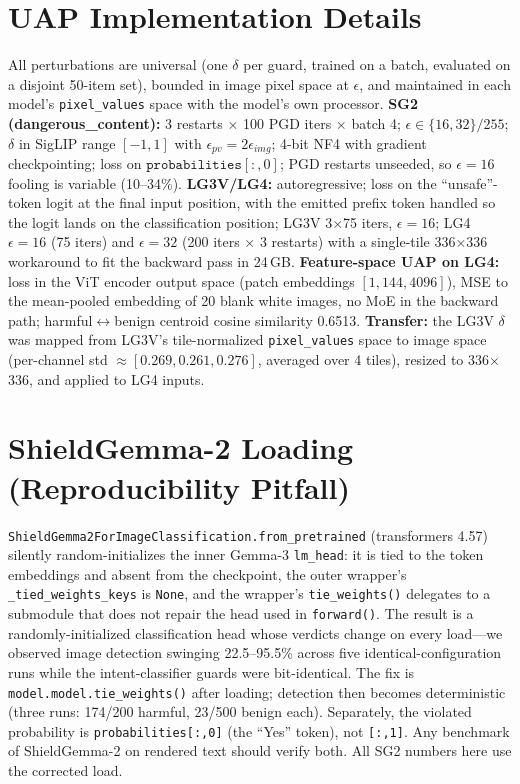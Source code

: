 \documentclass[11pt]{article}
\begin{document}
\section{UAP Implementation Details}
\label{app:uap}
All perturbations are universal (one $\delta$ per guard, trained on a batch, evaluated on a disjoint 50-item set), bounded in image pixel space at $\epsilon$, and maintained in each model's \texttt{pixel\_values} space with the model's own processor. \textbf{SG2 (dangerous\_content):} 3 restarts $\times$ 100 PGD iters $\times$ batch 4; $\epsilon\in\{16,32\}/255$; $\delta$ in SigLIP range $[-1,1]$ with $\epsilon_{pv}=2\epsilon_{img}$; 4-bit NF4 with gradient checkpointing; loss on $\texttt{probabilities}[:,0]$; PGD restarts unseeded, so $\epsilon{=}16$ fooling is variable (10--34\%). \textbf{LG3V/LG4:} autoregressive; loss on the ``unsafe''-token logit at the final input position, with the emitted prefix token handled so the logit lands on the classification position; LG3V 3$\times$75 iters, $\epsilon{=}16$; LG4 $\epsilon{=}16$ (75 iters) and $\epsilon{=}32$ (200 iters $\times$ 3 restarts) with a single-tile 336$\times$336 workaround to fit the backward pass in 24\,GB. \textbf{Feature-space UAP on LG4:} loss in the ViT encoder output space (patch embeddings $[1,144,4096]$), MSE to the mean-pooled embedding of 20 blank white images, no MoE in the backward path; harmful$\leftrightarrow$benign centroid cosine similarity 0.6513. \textbf{Transfer:} the LG3V $\delta$ was mapped from LG3V's tile-normalized \texttt{pixel\_values} space to image space (per-channel std $\approx[0.269,0.261,0.276]$, averaged over 4 tiles), resized to 336$\times$336, and applied to LG4 inputs.

\section{ShieldGemma-2 Loading (Reproducibility Pitfall)}
\label{app:sg2}
\texttt{ShieldGemma2ForImageClassification.from\_pretrained} (transformers 4.57) silently random-initializes the inner Gemma-3 \texttt{lm\_head}: it is tied to the token embeddings and absent from the checkpoint, the outer wrapper's \texttt{\_tied\_weights\_keys} is \texttt{None}, and the wrapper's \texttt{tie\_weights()} delegates to a submodule that does not repair the head used in \texttt{forward()}. The result is a randomly-initialized classification head whose verdicts change on every load---we observed image detection swinging 22.5--95.5\% across five identical-configuration runs while the intent-classifier guards were bit-identical. The fix is \texttt{model.model.tie\_weights()} after loading; detection then becomes deterministic (three runs: 174/200 harmful, 23/500 benign each). Separately, the violated probability is \texttt{probabilities[:,0]} (the ``Yes'' token), not \texttt{[:,1]}. Any benchmark of ShieldGemma-2 on rendered text should verify both. All SG2 numbers here use the corrected load.
\end{document}
